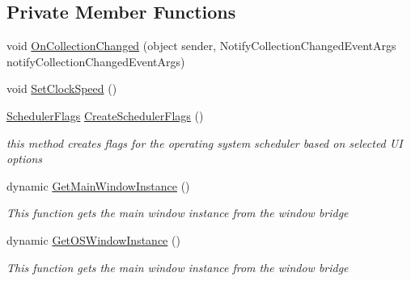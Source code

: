 \subsection*{Private Member Functions}
\begin{DoxyCompactItemize}
\item 
void \hyperlink{class_c_p_u___o_s___simulator_1_1_operating___system_1_1_o_s_core_abc6fc1ed70b080ea9079d548c86e88ec}{On\+Collection\+Changed} (object sender, Notify\+Collection\+Changed\+Event\+Args notify\+Collection\+Changed\+Event\+Args)
\item 
void \hyperlink{class_c_p_u___o_s___simulator_1_1_operating___system_1_1_o_s_core_a0697465a14d3f6111160c2c5a0d4082b}{Set\+Clock\+Speed} ()
\item 
\hyperlink{struct_c_p_u___o_s___simulator_1_1_operating___system_1_1_scheduler_flags}{Scheduler\+Flags} \hyperlink{class_c_p_u___o_s___simulator_1_1_operating___system_1_1_o_s_core_a0370de0efae69664c16b258846a64908}{Create\+Scheduler\+Flags} ()
\begin{DoxyCompactList}\small\item\em this method creates flags for the operating system scheduler based on selected U\+I options \end{DoxyCompactList}\item 
dynamic \hyperlink{class_c_p_u___o_s___simulator_1_1_operating___system_1_1_o_s_core_a6aa060134c64a17e248da359846f394b}{Get\+Main\+Window\+Instance} ()
\begin{DoxyCompactList}\small\item\em This function gets the main window instance from the window bridge \end{DoxyCompactList}\item 
dynamic \hyperlink{class_c_p_u___o_s___simulator_1_1_operating___system_1_1_o_s_core_a8943c071c2bb36810e560ef0e735f108}{Get\+O\+S\+Window\+Instance} ()
\begin{DoxyCompactList}\small\item\em This function gets the main window instance from the window bridge \end{DoxyCompactList}\end{DoxyCompactItemize}
